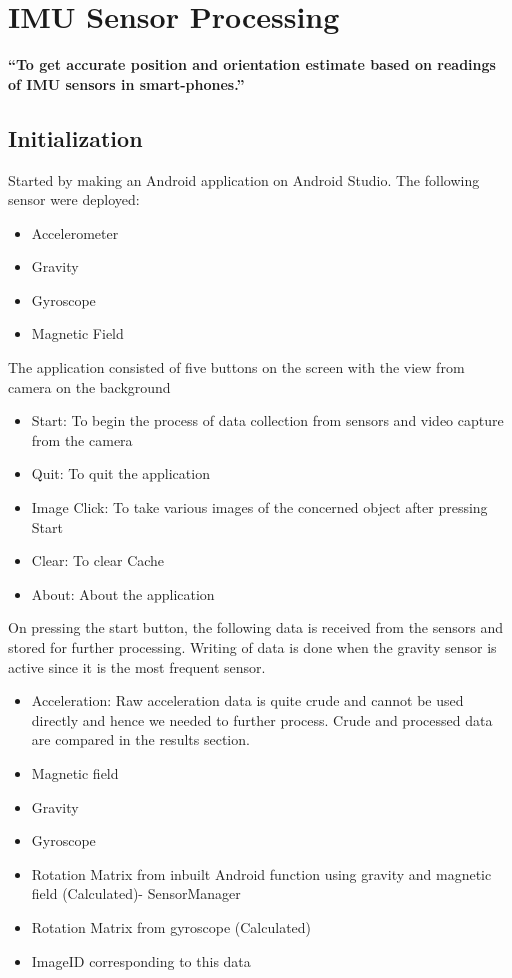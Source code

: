 \documentclass{article}
\begin{document}
	\newpage
	\section{IMU Sensor Processing}
		\textbf{``To get accurate position and orientation estimate based on readings of IMU sensors in smart-phones.''}
		\\
		\subsection{Initialization}
			Started by making an Android application on Android Studio. The following sensor were deployed:
				\begin{itemize}
				\item Accelerometer
				\item Gravity
				\item Gyroscope
				\item Magnetic Field
				\end{itemize} 
			The application consisted of five buttons on the screen with the view from camera on the background
				\begin{itemize}
				\item Start: To begin the process of data collection from sensors and video capture from the camera
				\item Quit: To quit the application
				\item Image Click: To take various images of the concerned object after pressing Start
				\item Clear: To clear Cache
				\item About: About the application
				\end{itemize}
			On pressing the start button, the following data is received from the sensors and stored for further processing. Writing of data is done when the gravity sensor is active since it is the most frequent sensor.
				\begin{itemize}
				\item Acceleration: Raw acceleration data is quite crude and cannot be used directly and hence we needed to further process. Crude and processed data are compared in the results section.
				\item Magnetic field
				\item Gravity
				\item Gyroscope
				\item Rotation Matrix from inbuilt Android function using gravity and magnetic field (Calculated)- SensorManager
				\item Rotation Matrix from gyroscope (Calculated)
				\item ImageID corresponding to this data
				\end{itemize}
\end{document}
